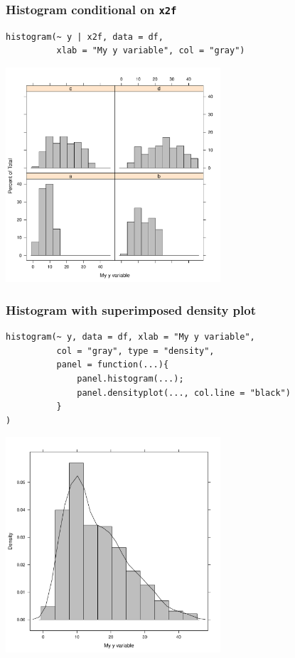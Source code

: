 \documentclass[bigger]{beamer}
\begin{document}
\begin{frame}[fragile]
\frametitle{Histogram conditional on \texttt{x2f}}
\label{sec-2_3}


\lstset{language=R}
\begin{lstlisting}
histogram(~ y | x2f, data = df, 
          xlab = "My y variable", col = "gray")
\end{lstlisting}



\includegraphics[width=0.6\textwidth]{../graphs/lattice_hist_g.pdf}
\end{frame}
\begin{frame}[fragile,shrink = 10]
\frametitle{Histogram with superimposed density plot}
\label{sec-2_4}

\lstset{language=R}
\begin{lstlisting}
histogram(~ y, data = df, xlab = "My y variable", 
          col = "gray", type = "density",
          panel = function(...){
              panel.histogram(...);
              panel.densityplot(..., col.line = "black")
          }
)
\end{lstlisting}



\includegraphics[width=0.6\textwidth]{../graphs/lattice_hist_dens.pdf}
\end{frame}
\end{document}
